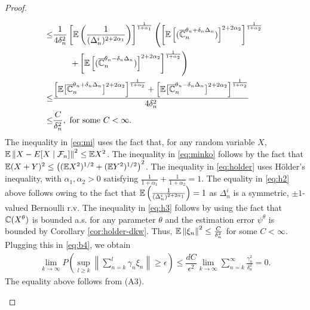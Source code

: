\begin{proof}
\begin{inparaenum}[$\bullet$]
\begin{align}
\le &\frac1{4\delta_n^2} \left[ \mathbb{E}\left(\frac1{(\Delta_n^i)^{2+2\alpha_1}}\right) \right]^{\frac{1}{1+\alpha_1}} \left(\left[\mathbb{E}\left[ (\overline {\mathbb{C}}_n^{\theta_n + \delta_n \Delta_n})\right]^{2+2\alpha_2}\right]^{\frac{1}{1+\alpha_2}} \right.\nonumber\\
&\left.\qquad+
\left[\mathbb{E}\left[ (\overline {\mathbb{C}}_n^{\theta_n - \delta_n \Delta_n})\right]^{2+2\alpha_2}\right]^{\frac{1}{1+\alpha_2}}\right)\label{eq:holder}\\
\le &\dfrac{\Big[\mathbb{E}\big[ \overline {\mathbb{C}}_n^{\theta_n + \delta_n \Delta_n}\big]^{2+2\alpha_2}\Big]^{\frac{1}{1+\alpha_2}}   +
\Big[\mathbb{E}\big[\overline {\mathbb{C}}_n^{\theta_n - \delta_n \Delta_n}\big]^{2+2\alpha_2}\Big]^{\frac{1}{1+\alpha_2}}}{4\delta_n^2} \label{eq:h2}\\
\le & \frac{C}{\delta_n^2}, \text{ for some } C< \infty. \label{eq:h3}
\end{align}
The inequality in \eqref{eq:mi} uses the fact that, for any random variable $X$, $\mathbb{E}\left\|X -  E[X\mid\mathcal{F}_n]\right\|^2 \le \mathbb{E} X^2$. The inequality in \eqref{eq:minko} follows by the fact that $\mathbb{E} (X+Y)^2 \le \left( (\mathbb{E} X^2)^{1/2} + (\mathbb{E} Y^2)^{1/2}\right)^2$.
The inequality in \eqref{eq:holder} uses H\"{o}lder's inequality, with $\alpha_1, \alpha_2>0$ satisfying $\frac{1}{1+\alpha_1} + \frac{1}{1+\alpha_2}=1$. 
The equality in \eqref{eq:h2} above follows owing to the fact that $\mathbb{E}\left(\frac1{(\Delta_n^i)^{2+2\alpha_1}}\right)  = 1$ as $\Delta_n^i$ is a symmetric, $\pm 1$-valued Bernoulli r.v. 
The inequality in \eqref{eq:h3} follows by using the fact that
$\mathbb{C}(X^\theta)$ is bounded a.s. for any parameter $\theta$ and the estimation error $\psi^\theta$ is bounded by Corollary \ref{cor:holder-dkw}.
Thus, $\mathbb{E}\left\| \xi_n\right\|^2 \le \frac{C}{\delta_n^2}$ for some $C<\infty$. Plugging this in \eqref{eq:b4}, we obtain
\begin{align*}
 \lim_{k\rightarrow\infty} P\left( \sup_{l\geq k}   \left\|\sum_{n=k}^{l} \gamma_n \xi_n\right\|\geq \epsilon \right) \le \dfrac{d C}{\epsilon^2} \lim_{k\rightarrow\infty} \sum_{n=k}^{\infty}  \frac{\gamma_n^2}{\delta_n^2} =0.
\end{align*}
The equality above follows from (A3).\\

\end{inparaenum}
\end{proof}
